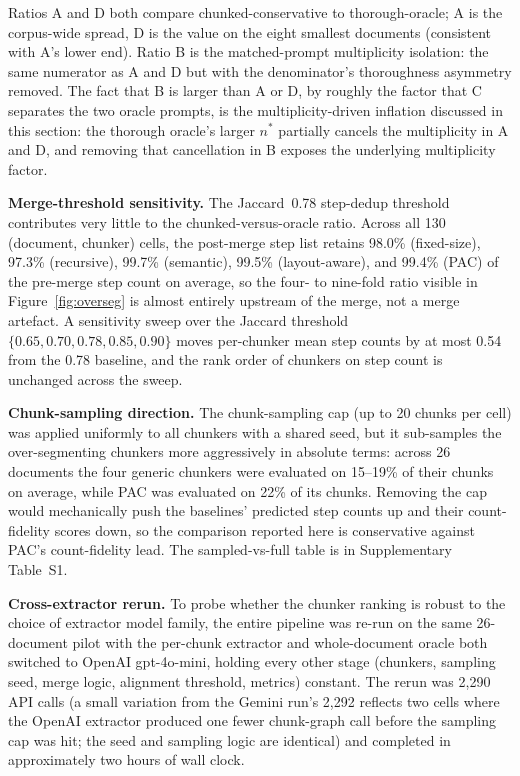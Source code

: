 \documentclass[make,article,submit,oneauthor,pdftex]{Definitions/mdpi}
\begin{document}
Ratios A and D both compare chunked-conservative to thorough-oracle;
A is the corpus-wide spread, D is the value on the eight smallest
documents (consistent with A's lower end). Ratio B is the
matched-prompt multiplicity isolation: the same numerator as A and D
but with the denominator's thoroughness asymmetry removed. The fact
that B is larger than A or D, by roughly the factor that C separates
the two oracle prompts, is the multiplicity-driven inflation
discussed in this section: the thorough oracle's larger $n^{*}$
partially cancels the multiplicity in A and D, and removing that
cancellation in B exposes the underlying multiplicity factor.

\textbf{Merge-threshold sensitivity.} The Jaccard~0.78 step-dedup
threshold contributes very little to the chunked-versus-oracle ratio.
Across all 130 (document, chunker) cells, the post-merge step list
retains 98.0\% (fixed-size), 97.3\% (recursive), 99.7\% (semantic),
99.5\% (layout-aware), and 99.4\% (PAC) of the pre-merge step count
on average, so the four- to nine-fold ratio visible in
Figure~\ref{fig:overseg} is almost entirely upstream of the merge,
not a merge artefact. A sensitivity sweep over the Jaccard threshold
$\{0.65,0.70,0.78,0.85,0.90\}$ moves per-chunker mean step counts by
at most 0.54 from the 0.78 baseline, and the rank order of chunkers
on step count is unchanged across the sweep.

\textbf{Chunk-sampling direction.} The chunk-sampling cap (up to 20
chunks per cell) was applied uniformly to all chunkers with a shared
seed, but it sub-samples the over-segmenting chunkers more
aggressively in absolute terms: across 26 documents the four generic
chunkers were evaluated on 15--19\% of their chunks on average,
while PAC was evaluated on 22\% of its chunks. Removing the cap would
mechanically push the baselines' predicted step counts up and their
count-fidelity scores down, so the comparison reported here is
conservative against PAC's count-fidelity lead. The sampled-vs-full
table is in Supplementary Table~S1.

\textbf{Cross-extractor rerun.} To probe whether the chunker ranking
is robust to the choice of extractor model family, the entire pipeline
was re-run on the same 26-document pilot with the per-chunk extractor
and whole-document oracle both switched to OpenAI gpt-4o-mini, holding
every other stage (chunkers, sampling seed, merge logic, alignment
threshold, metrics) constant. The rerun was 2{,}290 API calls (a
small variation from the Gemini run's 2{,}292 reflects two cells where
the OpenAI extractor produced one fewer chunk-graph call before the
sampling cap was hit; the seed and sampling logic are identical) and
completed in approximately two hours of wall clock.
\end{document}
